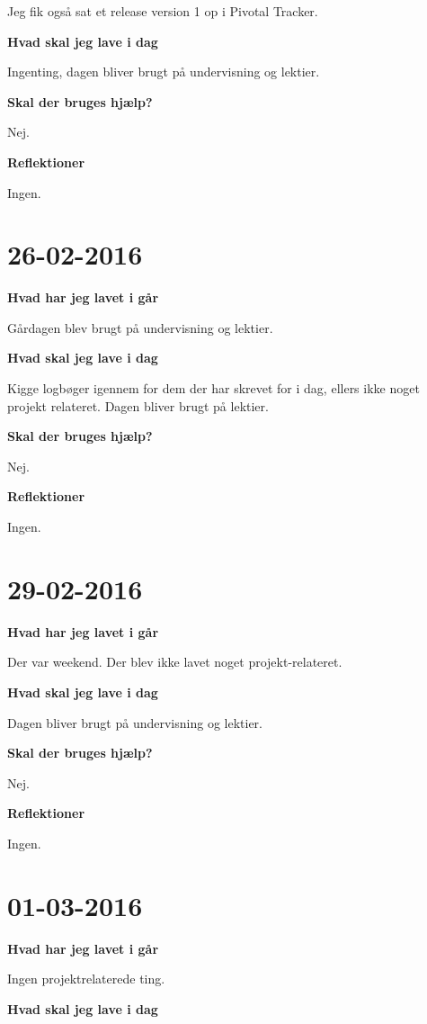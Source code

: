 \documentclass{article}
\begin{document}
	Jeg fik også sat et release version 1 op i Pivotal Tracker.
	
	\textbf{Hvad skal jeg lave i dag}
	
	Ingenting, dagen bliver brugt på undervisning og lektier.
	
	\textbf{Skal der bruges hjælp?}
	
	Nej.
	
	\textbf{Reflektioner}
	
	Ingen.
	
	\section{26-02-2016}
	
	\textbf{Hvad har jeg lavet i går}
	
	Gårdagen blev brugt på undervisning og lektier.
	
	\textbf{Hvad skal jeg lave i dag}
	
	Kigge logbøger igennem for dem der har skrevet for i dag, ellers ikke noget projekt relateret. Dagen bliver brugt på lektier.
	
	\textbf{Skal der bruges hjælp?}
	
	Nej.
	
	\textbf{Reflektioner}
	
	Ingen.
	
	\section{29-02-2016}
	
	\textbf{Hvad har jeg lavet i går}
	
	Der var weekend. Der blev ikke lavet noget projekt-relateret.
	
	\textbf{Hvad skal jeg lave i dag}
	
	Dagen bliver brugt på undervisning og lektier.
	
	\textbf{Skal der bruges hjælp?}
	
	Nej.
	
	\textbf{Reflektioner}
	
	Ingen.
	
	\section{01-03-2016}
	
	\textbf{Hvad har jeg lavet i går}
	
	Ingen projektrelaterede ting.
	
	\textbf{Hvad skal jeg lave i dag}
	
\end{document}
